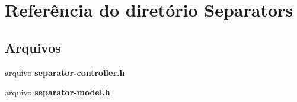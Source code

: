 \section{Referência do diretório Separators}
\label{dir_1c5d0d82e9daf89652056218505fdc84}
\subsection*{Arquivos}
\begin{DoxyCompactItemize}
\item 
arquivo {\bf separator-\/controller.\+h}
\item 
arquivo {\bf separator-\/model.\+h}
\end{DoxyCompactItemize}
